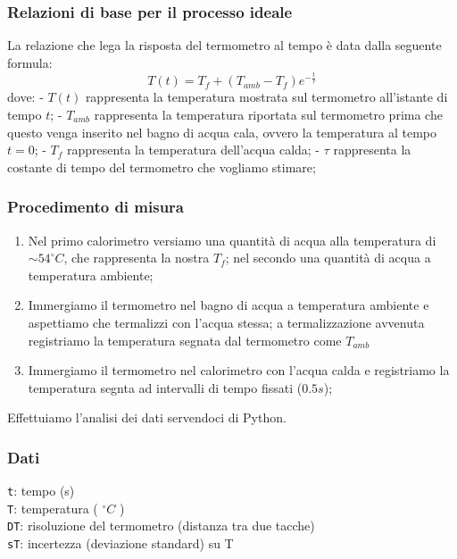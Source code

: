\documentclass[11pt]{article}
\providecommand{\tightlist}{%
      \setlength{\itemsep}{0pt}\setlength{\parskip}{0pt}}
\begin{document}
\hypertarget{relazioni-di-base-per-il-processo-ideale}{%
\subsubsection{Relazioni di base per il processo
ideale}\label{relazioni-di-base-per-il-processo-ideale}}

La relazione che lega la risposta del termometro al tempo è data dalla
seguente formula: \[T(t)=T_{f}+(T_{amb}-T_{f} )e ^{-\frac{t}{\tau}}\]
dove: - \(T(t)\) rappresenta la temperatura mostrata sul termometro
all'istante di tempo \(t\); - \(T_{amb}\) rappresenta la temperatura
riportata sul termometro prima che questo venga inserito nel bagno di
acqua cala, ovvero la temperatura al tempo \(t=0\); - \(T_{f}\)
rappresenta la temperatura dell'acqua calda; - \(\tau\) rappresenta la
costante di tempo del termometro che vogliamo stimare;

\hypertarget{procedimento-di-misura}{%
\subsubsection{Procedimento di misura}\label{procedimento-di-misura}}

\begin{enumerate}
\def\labelenumi{\arabic{enumi}.}
\tightlist
\item
  Nel primo calorimetro versiamo una quantità di acqua alla temperatura
  di \(\sim 54^\circ C\), che rappresenta la nostra \(T_{f}\); nel
  secondo una quantità di acqua a temperatura ambiente;
\item
  Immergiamo il termometro nel bagno di acqua a temperatura ambiente e
  aspettiamo che termalizzi con l'acqua stessa; a termalizzazione
  avvenuta registriamo la temperatura segnata dal termometro come
  \(T_{amb}\)
\item
  Immergiamo il termometro nel calorimetro con l'acqua calda e
  registriamo la temperatura segnta ad intervalli di tempo fissati
  (\(0.5s\));
\end{enumerate}

Effettuiamo l'analisi dei dati servendoci di Python.

    \hypertarget{dati}{%
\subsubsection{Dati}\label{dati}}

\texttt{t}: tempo (s)\\
\texttt{T}: temperatura ( \(^\circ C\) )\\
\texttt{DT}: risoluzione del termometro (distanza tra due tacche)\\
\texttt{sT}: incertezza (deviazione standard) su T
\end{document}

